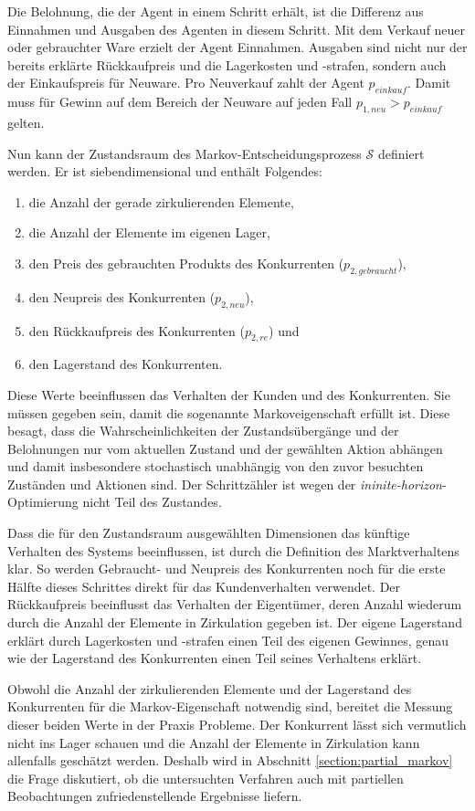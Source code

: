 Die Belohnung, die der Agent in einem Schritt erhält, ist die Differenz aus Einnahmen und Ausgaben des Agenten in diesem Schritt.
Mit dem Verkauf neuer oder gebrauchter Ware erzielt der Agent Einnahmen.
Ausgaben sind nicht nur der bereits erklärte Rückkaufpreis und die Lagerkosten und -strafen, sondern auch der Einkaufspreis für Neuware.
Pro Neuverkauf zahlt der Agent $p_{einkauf}$.
Damit muss für Gewinn auf dem Bereich der Neuware auf jeden Fall $p_{1, neu} > p_{einkauf}$ gelten.

Nun kann der Zustandsraum des Markov-Entscheidungsprozess $\mathcal{S}$ definiert werden.
Er ist siebendimensional und enthält Folgendes:
\begin{enumerate}
	\item die Anzahl der gerade zirkulierenden Elemente,
	\item die Anzahl der Elemente im eigenen Lager,
	\item den Preis des gebrauchten Produkts des Konkurrenten ($p_{2, gebraucht}$),
	\item den Neupreis des Konkurrenten ($p_{2, neu}$),
	\item den Rückkaufpreis des Konkurrenten ($p_{2, re}$) und
	\item den Lagerstand des Konkurrenten.
\end{enumerate}
Diese Werte beeinflussen das Verhalten der Kunden und des Konkurrenten.
Sie müssen gegeben sein, damit die sogenannte Markoveigenschaft erfüllt ist.
Diese besagt, dass die Wahrscheinlichkeiten der Zustandsübergänge und der Belohnungen nur vom aktuellen Zustand und der gewählten Aktion abhängen und damit insbesondere stochastisch unabhängig von den zuvor besuchten Zuständen und Aktionen sind.
Der Schrittzähler ist wegen der \textit{ininite-horizon}-Optimierung nicht Teil des Zustandes.

Dass die für den Zustandsraum ausgewählten Dimensionen das künftige Verhalten des Systems beeinflussen, ist durch die Definition des Marktverhaltens klar.
So werden Gebraucht- und Neupreis des Konkurrenten noch für die erste Hälfte dieses Schrittes direkt für das Kundenverhalten verwendet.
Der Rückkaufpreis beeinflusst das Verhalten der Eigentümer, deren Anzahl wiederum durch die Anzahl der Elemente in Zirkulation gegeben ist.
Der eigene Lagerstand erklärt durch Lagerkosten und -strafen einen Teil des eigenen Gewinnes, genau wie der Lagerstand des Konkurrenten einen Teil seines Verhaltens erklärt.

Obwohl die Anzahl der zirkulierenden Elemente und der Lagerstand des Konkurrenten für die Markov-Eigenschaft notwendig sind, bereitet die Messung dieser beiden Werte in der Praxis Probleme.
Der Konkurrent lässt sich vermutlich nicht ins Lager schauen und die Anzahl der Elemente in Zirkulation kann allenfalls geschätzt werden.
Deshalb wird in Abschnitt \ref{section:partial_markov} die Frage diskutiert, ob die untersuchten Verfahren auch mit partiellen Beobachtungen zufriedenstellende Ergebnisse liefern.

